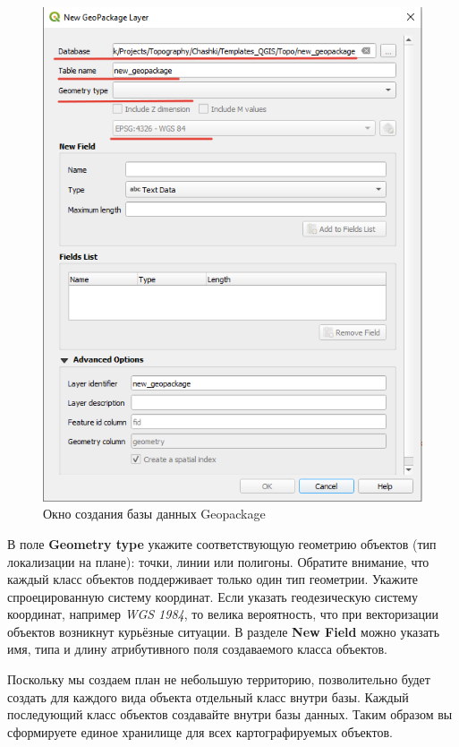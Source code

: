 \documentclass[
  12pt,
]{book}
\begin{document}
\begin{figure}
\centering
\includegraphics{images/Practice/Create_gpkg.png}
\caption{Окно создания базы данных Geopackage}
\end{figure}

В поле \textbf{Geometry type} укажите соответствующую геометрию объектов (тип локализации на плане): точки, линии или полигоны. Обратите внимание, что каждый класс объектов поддерживает только один тип геометрии. Укажите спроецированную систему координат. Если указать геодезическую систему координат, например \emph{WGS 1984}, то велика вероятность, что при векторизации объектов возникнут курьёзные ситуации.
В разделе \textbf{New Field} можно указать имя, типа и длину атрибутивного поля создаваемого класса объектов.

Поскольку мы создаем план не небольшую территорию, позволительно будет создать для каждого вида объекта отдельный класс внутри базы. Каждый последующий класс объектов создавайте внутри базы данных. Таким образом вы сформируете единое хранилище для всех картографируемых объектов.
\end{document}
